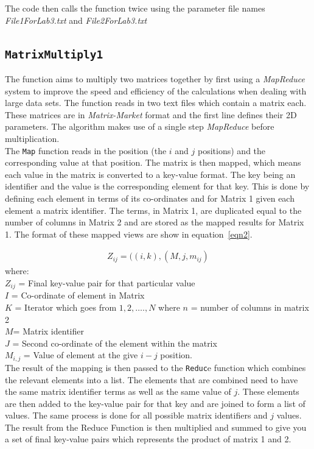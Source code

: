 \documentclass[10pt, conference]{IEEEtran}
\def\code#1{\texttt{#1}}
\begin{document}
The code then calls the function twice using the parameter file names \emph{File1ForLab3.txt} and \emph{File2ForLab3.txt}

\subsection{\code{MatrixMultiply1}}
\label{MatrixMultiply1}
The function aims to multiply two matrices together by first using a \emph{MapReduce} system to improve the speed and efficiency of the calculations when dealing with large data sets. The function reads in two text files which contain a matrix each. These matrices are in \emph{Matrix-Market} format and the first line defines their 2D parameters. The algorithm makes use of a single step \emph{MapReduce} before multiplication.\\

The \code{Map} function reads in the position (the $i$ and $j$ positions) and the corresponding value at that position. The matrix is then mapped, which means each value in the matrix is converted to a key-value format. The key being an identifier and the value is the corresponding element for that key. This is done by defining each element in terms of its co-ordinates and for Matrix 1 given each element a matrix identifier. The terms, in Matrix 1, are duplicated equal to the number of columns in Matrix 2 and are stored as the mapped results for Matrix 1. The format of these mapped views are show in equation~\ref{eqn2}.

\begin{equation}
\label{eqn2}
\begin{split}
Z_{ij} = ((i,k),(M,j, m_{ij})
\end{split}
\end{equation}
where:\\
$Z_{ij}$  = Final key-value pair for that particular value\\
$I$ = Co-ordinate of element in Matrix \\
$K$ = Iterator which goes from $1,2,…., N$ where $n$ = number of columns in matrix 2\\
$M$= Matrix identifier \\
$J$ = Second co-ordinate of the element within the matrix\\
$M_{i, j}$  = Value of element at the give $i-j$ position.\\

The result of the mapping is then passed to the \code{Reduc}e function which combines the relevant elements into a list. The elements that are combined need to have the same matrix identifier terms as well as the same value of $j$. These elements are then added to the key-value pair for that key and are joined to form a list of values. The same process is done for all possible matrix identifiers and $j$ values. The result from the Reduce Function is then multiplied and summed to give you a set of final key-value pairs which represents the product of matrix 1 and 2.
\end{document}

